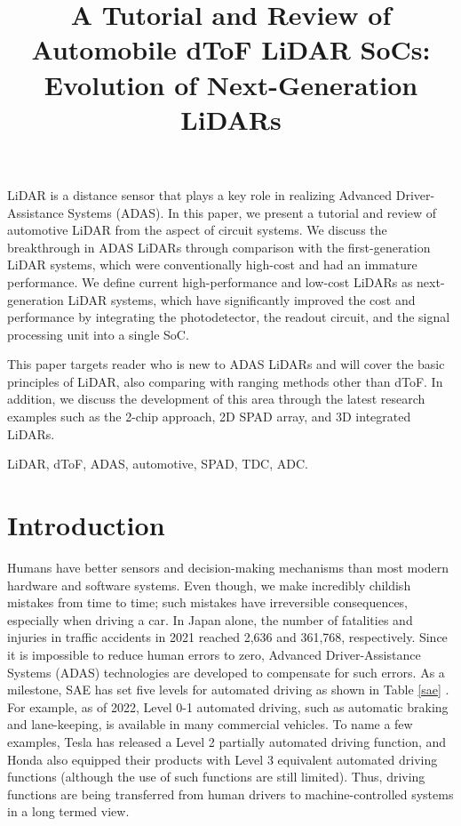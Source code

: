 \documentclass[paper]{ieice}
\title{\LARGE \bf
A Tutorial and Review of Automobile dToF LiDAR SoCs: \\Evolution of Next-Generation LiDARs
}
\begin{document}
\maketitle
\thispagestyle{empty}
\pagestyle{empty}


\begin{summary}
LiDAR is a distance sensor that plays a key role in realizing Advanced Driver-Assistance Systems (ADAS).
In this paper, we present a tutorial and review of automotive LiDAR from the aspect of circuit systems.
We discuss the breakthrough in ADAS LiDARs through comparison with the first-generation LiDAR systems, which were conventionally high-cost and had an immature performance. We define current high-performance and low-cost LiDARs as next-generation LiDAR systems, which have significantly improved the cost and performance by integrating the photodetector, the readout circuit, and the signal processing unit into a single SoC.

This paper targets reader who is new to ADAS LiDARs and will cover the basic principles of LiDAR, also comparing with ranging methods other than dToF.
In addition, we discuss the development of this area through the latest research examples such as the 2-chip approach, 2D SPAD array, and 3D integrated LiDARs.

\end{summary}

\begin{keywords}
LiDAR, dToF, ADAS, automotive, SPAD, TDC, ADC.
\end{keywords}
\section{Introduction}
\qquad Humans have better sensors and decision-making mechanisms than most modern hardware and software systems. Even though, we make incredibly childish mistakes from time to time; such mistakes have irreversible consequences, especially when driving a car. In Japan alone, the number of fatalities and injuries in traffic accidents in 2021 reached 2,636 and 361,768, respectively\cite{keisatsu}. Since it is impossible to reduce human errors to zero, Advanced Driver-Assistance Systems (ADAS) technologies are developed to compensate for such errors. As a milestone, SAE has set five levels for automated driving as shown in Table \ref{sae} \cite{sae}. For example, as of 2022, Level 0-1 automated driving, such as automatic braking and lane-keeping, is available in many commercial vehicles. To name a few examples, Tesla has released a Level 2 partially automated driving function, and Honda also equipped their products with Level 3 equivalent automated driving functions (although the use of such functions are still limited)\cite{honda}. Thus, driving functions are being transferred from human drivers to machine-controlled systems in a long termed view.
\end{document}
